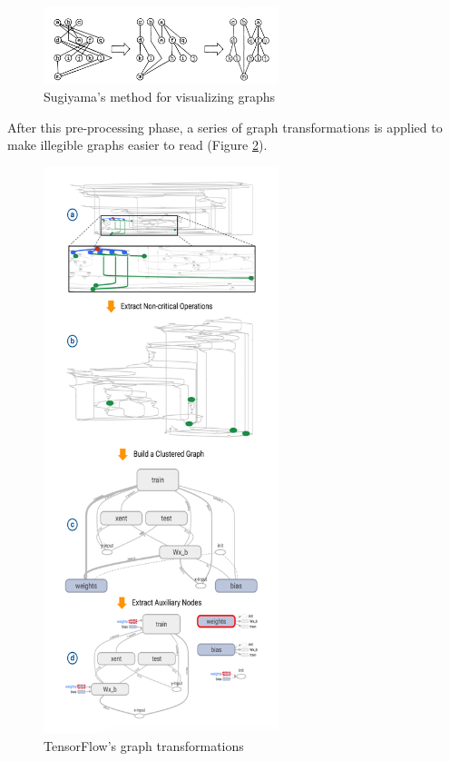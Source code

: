 \documentclass{acmsiggraph}               %
\begin{document}
\begin{figure}[H]
\includegraphics[width=2.7in]{sugiyama_method_sugiyama_et_al}
\caption{Sugiyama's method for visualizing graphs \protect\cite{Sugiyama1981}}
\label{fig:sugiyama_method}
\centering
\end{figure}

After this pre-processing phase, a series of graph transformations is applied to make illegible graphs easier to read (Figure \ref{fig:transformations}). \\

\begin{figure}[!htb]
\includegraphics[width=2.7in]{transformations_Wongsuphasawat_et_al}
\caption{TensorFlow's graph transformations \protect\cite{Wongsuphasawat2018}}
\label{fig:transformations}
\end{figure}
\end{document}
